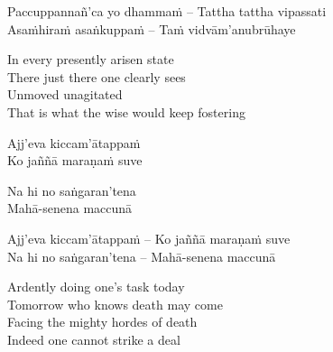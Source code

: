 \else

\begin{verses}
  Paccuppannañ'ca yo dhammaṁ – Tattha tattha vipassati\\
  Asaṁhiraṁ asaṅkuppaṁ – Taṁ vidvā\ifdigital\makeatletter\hyperlink{endnote156-appendix}\fi m'anubrūhaye
\end{verses}

\fi

\begin{english-verses}
  In every presently arisen state\\
  There just there one clearly sees\\
  Unmoved unagitated\\
  That is what the wise would keep fostering\ifdigital\makeatletter\hyperlink{endnote43-appendix}\makeatother\fi
\end{english-verses}

\ifninebythirteen

\clearpage

\begin{pali-hang-verses}
  Ajj'eva kiccam'ātappaṁ\\
  Ko jaññā maraṇaṁ suve
\end{pali-hang-verses}
\begin{pali-hang-together}
  Na hi no saṅgaran'tena\\
  Mahā-senena maccunā
\end{pali-hang-together}

\else

\begin{verses}
  Ajj'eva kiccam'ātappaṁ – Ko jaññā maraṇaṁ suve\\
  Na hi no saṅgaran'tena – Mahā-senena maccunā
\end{verses}

\fi

\begin{english-verses}
  Ardently doing one's task today\\
  Tomorrow who knows death may come\\
  Facing the mighty hordes of death\\
  Indeed one cannot strike a deal
\end{english-verses}

